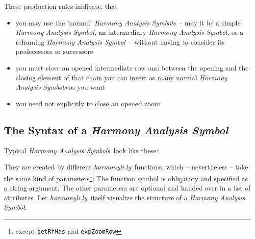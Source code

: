 \documentclass[
  DIV=calc,
  BCOR=5mm,
  12pt,
  headings=small,
  oneside,
  abstract=true,
  toc=bib,
  xcolor=dvipsnames,
  openany,
  ngerman,english]{scrartcl}
\newcommand{\hlyn}[0]{\textit{harmonyli.ly}}
\newcommand{\has}[1]{\textit{Harmony Analysis Symbol#1}}
\begin{document}
These production rules inidicate, that 
\begin{itemize}
  \item you may use the 'normal' \has{s}\ -- may it be a simple \has, an
  intermediary \has, or a reframing \has\ -- without having to consider its
  predecessors or successors
  \item you must close an opened intermediate row and between the opening and
  the closing element of that chain you can insert as many normal \has{s} as you
  want
  \item you need not explicitly to close an opened zoom
\end{itemize}


\subsection{The Syntax of a \has{}}

Typical \has{s}\ look like these:

\begin{center}
\end{center}

They are created by different \hlyn\ functions, which -- nevertheless -- take
the same kind of parameters\footnote{except \texttt{setRfHas} and
\texttt{expZoomRow}}: The function symbol is obligatory and specified as a string
argument. The other parameters are optional and handed over in a list of
attributes. Let \hlyn\ itself visualize the structure of a \has{}:
\end{document}
